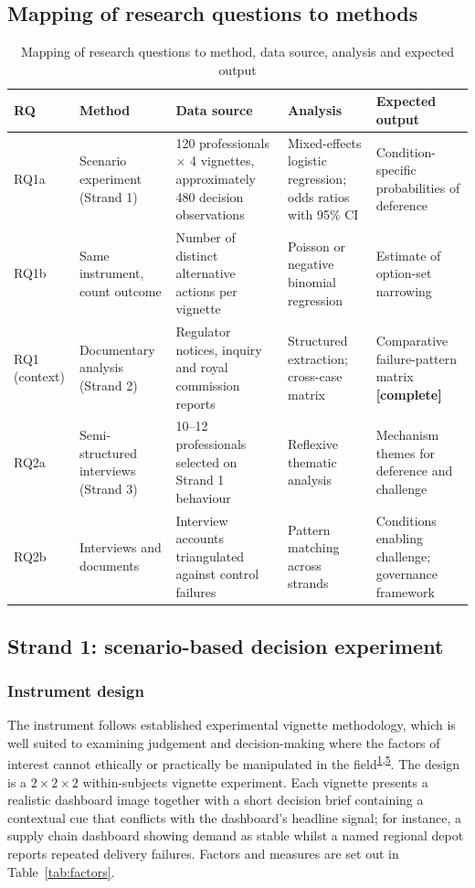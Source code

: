 \documentclass[11pt,a4paper]{article}
\numberwithin{figure}{section}
\numberwithin{table}{section}
\begin{document}
\subsection{Mapping of research questions to methods}

\begin{table}[H]
\centering\footnotesize
\caption{Mapping of research questions to method, data source, analysis and expected output}
\label{tab:matrix}
\begin{tabularx}{\textwidth}{@{}p{1.0cm} p{2.3cm} X p{2.6cm} p{2.7cm}@{}}
\toprule
\textbf{RQ} & \textbf{Method} & \textbf{Data source} & \textbf{Analysis} & \textbf{Expected output} \\
\midrule
RQ1a & Scenario experiment (Strand 1) & 120 professionals $\times$ 4 vignettes, approximately 480 decision
observations & Mixed-effects logistic regression; odds ratios with 95\% CI & Condition-specific
probabilities of deference \\
RQ1b & Same instrument, count outcome & Number of distinct alternative actions per vignette & Poisson or
negative binomial regression & Estimate of option-set narrowing \\
RQ1 (context) & Documentary analysis (Strand 2) & Regulator notices, inquiry and royal commission reports &
Structured extraction; cross-case matrix & Comparative failure-pattern matrix \textbf{[complete]} \\
RQ2a & Semi-structured interviews (Strand 3) & 10--12 professionals selected on Strand 1 behaviour &
Reflexive thematic analysis & Mechanism themes for deference and challenge \\
RQ2b & Interviews and documents & Interview accounts triangulated against control failures & Pattern
matching across strands & Conditions enabling challenge; governance framework \\
\bottomrule
\end{tabularx}
\end{table}

\subsection{Strand 1: scenario-based decision experiment}

\subsubsection{Instrument design}

The instrument follows established experimental vignette methodology, which is well suited to examining
judgement and decision-making where the factors of interest cannot ethically or practically be manipulated
in the field\textsuperscript{\hyperlink{ref1}{1},\hyperlink{ref5}{5}}. The design is a $2\times2\times2$ within-subjects vignette
experiment. Each vignette presents a realistic dashboard image together with a short decision brief
containing a contextual cue that conflicts with the dashboard's headline signal; for instance, a supply
chain dashboard showing demand as stable whilst a named regional depot reports repeated delivery failures.
Factors and measures are set out in Table~\ref{tab:factors}.
\end{document}
